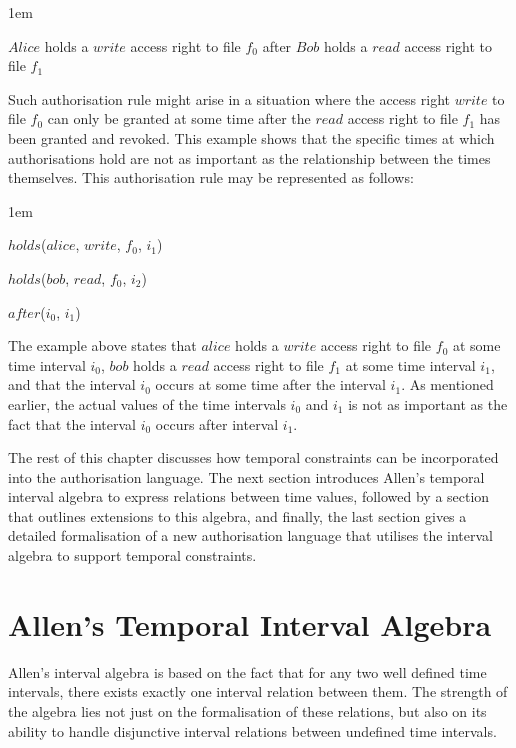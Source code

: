 \documentclass[11pt]{report}
\newenvironment{vquote}
{
  \begin{list}{}{\leftmargin 1em}\item[]
}
{
  \end{list}
}
\begin{document}
      \begin{vquote}
        $Alice$ holds a $write$ access right to file $f_0$ after $Bob$ holds a
        $read$ access right to file $f_1$
      \end{vquote}

      Such authorisation rule might arise in a situation where the access right
      $write$ to file $f_0$ can only be granted at some time after the $read$
      access right to file $f_1$ has been granted and revoked. This example
      shows that the specific times at which authorisations hold are not as
      important as the relationship between the times themselves. This
      authorisation rule may be represented as follows:

      \begin{vquote}
        $holds$($alice$, $write$, $f_0$, $i_{1}$)

        $holds$($bob$, $read$, $f_0$, $i_{2}$)

        $after$($i_0$, $i_1$)
      \end{vquote}

      The example above states that $alice$ holds a $write$ access right to
      file $f_0$ at some time interval $i_0$, $bob$ holds a $read$ access right
      to file $f_1$ at some time interval $i_1$, and that the interval $i_0$
      occurs at some time after the interval $i_1$. As mentioned earlier, the
      actual values of the time intervals $i_0$ and $i_1$ is not as important
      as the fact that the interval $i_0$ occurs after interval $i_1$.

      The rest of this chapter discusses how temporal constraints can be
      incorporated into the authorisation language. The next section introduces
      Allen's temporal interval algebra to express relations between time
      values, followed by a section that outlines extensions to this algebra,
      and finally, the last section gives a detailed formalisation of a new
      authorisation language that utilises the interval algebra to support
      temporal constraints.

    \section{Allen's Temporal Interval Algebra}

      Allen's interval algebra \cite{AL} is based on the fact that for any
      two well defined time intervals, there exists exactly one interval
      relation between them. The strength of the algebra lies not just on
      the formalisation of these relations, but also on its ability to handle
      disjunctive interval relations between undefined time intervals.
\end{document}
